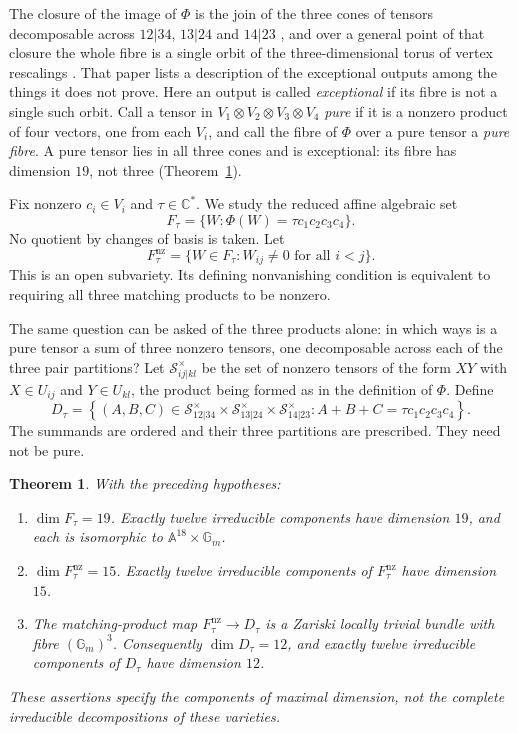 \documentclass[11pt,letterpaper]{article}
\newcommand{\C}{\mathbb C}
\newcommand{\A}{\mathbb A}
\newcommand{\Gm}{\mathbb G_m}
\newcommand{\Ftau}{F_\tau}
\newcommand{\Fact}{F_\tau^{\mathrm{nz}}}
\newcommand{\Ddec}{D_\tau}
\newtheorem{theorem}{Theorem}[section]
\theoremstyle{definition}
\begin{document}
The closure of the image of \(\Phi\) is the join of the three cones of
tensors decomposable across \(12|34\), \(13|24\) and \(14|23\)
\cite[Proposition~7.1 and its proof]{ign-geometry}, and over a general
point of that closure the whole fibre is a single orbit of the
three-dimensional torus of vertex rescalings
\cite[Theorem~4.5]{ign-geometry}. That paper lists a description of the
exceptional outputs among the things it does not prove. Here an output is
called \emph{exceptional} if its fibre is not a single such orbit. Call a
tensor in \(V_1\otimes V_2\otimes V_3\otimes V_4\) \emph{pure} if it is a
nonzero product of four vectors, one from each \(V_i\), and call the fibre
of \(\Phi\) over a pure tensor a \emph{pure fibre}. A pure tensor lies in
all three cones and is exceptional: its fibre has dimension \(19\), not
three (Theorem~\ref{main:geometry}).

Fix nonzero \(c_i\in V_i\) and \(\tau\in\C^*\). We study the reduced affine
algebraic set
\[
 \Ftau=\{W:\Phi(W)=\tau c_1c_2c_3c_4\}.
\]
No quotient by changes of basis is taken. Let
\[
 \Fact=\{W\in\Ftau:W_{ij}\ne0\text{ for all }i<j\}.
\]
This is an open subvariety. Its defining nonvanishing condition is equivalent
to requiring all three matching products to be nonzero.

The same question can be asked of the three products alone: in which ways
is a pure tensor a sum of three nonzero tensors, one decomposable across
each of the three pair partitions? Let \(\mathcal S_{ij|kl}^{\times}\) be
the set of nonzero tensors of the form \(XY\) with \(X\in U_{ij}\) and
\(Y\in U_{kl}\), the product being formed as in the definition of \(\Phi\).
Define
\[
 \Ddec=\left\{(A,B,C)\in
 \mathcal S_{12|34}^{\times}\times
 \mathcal S_{13|24}^{\times}\times
 \mathcal S_{14|23}^{\times}:
 A+B+C=\tau c_1c_2c_3c_4\right\}.
\]
The summands are ordered and their three partitions are prescribed. They need
not be pure.

\begin{theorem}\label{main:geometry}
With the preceding hypotheses:
\begin{enumerate}
\item \(\dim\Ftau=19\). Exactly twelve irreducible components have dimension
\(19\), and each is isomorphic to \(\A^{18}\times\Gm\).
\item \(\dim\Fact=15\). Exactly twelve irreducible components of \(\Fact\)
have dimension \(15\).
\item The matching-product map \(\Fact\to\Ddec\) is a Zariski locally trivial
bundle with fibre \((\Gm)^3\). Consequently \(\dim\Ddec=12\), and exactly
twelve irreducible components of \(\Ddec\) have dimension \(12\).
\end{enumerate}
These assertions specify the components of maximal dimension, not the
complete irreducible decompositions of these varieties.
\end{theorem}
\end{document}
